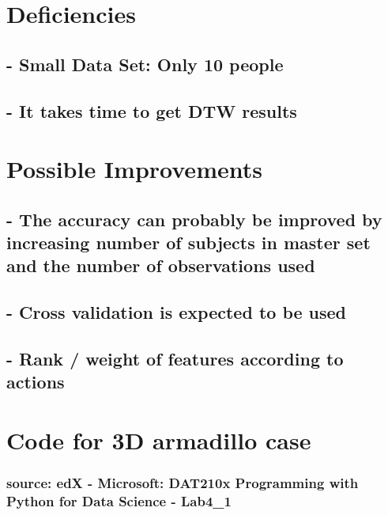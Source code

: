 \documentclass[11pt]{article}
\begin{document}
    \section{Deficiencies}\label{deficiencies}

\subsection{- Small Data Set: Only 10
people​}\label{small-data-set-only-10-people}

\subsection{- It takes time to get DTW
results}\label{it-takes-time-to-get-dtw-results}

    \section{Possible Improvements}\label{possible-improvements}

\subsection{- The accuracy can probably be improved by increasing number
of subjects in master set and the number of observations
used​}\label{the-accuracy-can-probably-be-improved-by-increasing-number-of-subjects-in-master-set-and-the-number-of-observations-used}

\subsection{- Cross validation is expected to be
used​}\label{cross-validation-is-expected-to-be-used}

\subsection{- Rank / weight of features according to
actions}\label{rank-weight-of-features-according-to-actions}

    \section{Code for 3D armadillo case}\label{code-for-3d-armadillo-case}

\subsubsection{source: edX - Microsoft: DAT210x Programming with Python
for Data Science -
Lab4\_1}\label{source-edx---microsoft-dat210x-programming-with-python-for-data-science---lab4_1}
\end{document}
